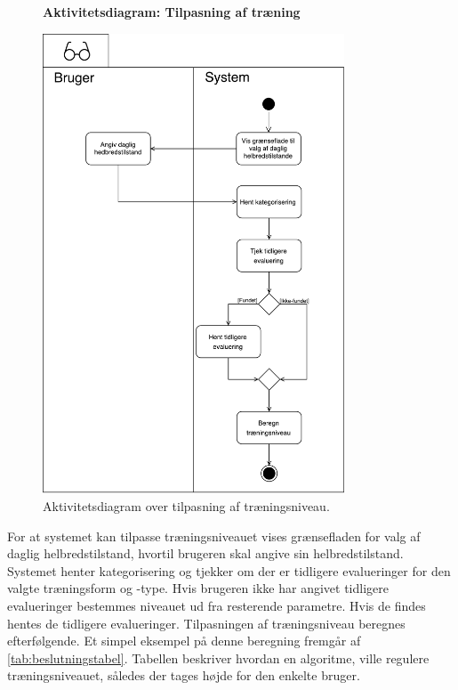 \begin{figure} [H]
\centering
\textbf{Aktivitetsdiagram: Tilpasning af træning}\par\medskip
\includegraphics[width=0.8\textwidth]{figures/aktivitetsdiagram/Tilpasningaftraeningsniveau}
\caption{Aktivitetsdiagram over tilpasning af træningsniveau.}
\label{fig:traeningsniveau}
\end{figure}

\noindent
For at systemet kan tilpasse træningsniveauet vises grænsefladen for valg af daglig helbredstilstand, hvortil brugeren skal angive sin helbredstilstand. Systemet henter kategorisering og tjekker om der er tidligere evalueringer for den valgte træningsform og -type. Hvis brugeren ikke har angivet tidligere evalueringer bestemmes niveauet ud fra resterende parametre. Hvis de findes hentes de tidligere evalueringer. Tilpasningen af træningsniveau beregnes efterfølgende. Et simpel eksempel på denne beregning fremgår af \autoref{tab:beslutningstabel}. Tabellen beskriver hvordan en algoritme, ville regulere træningsniveauet, således der tages højde for den enkelte bruger.

